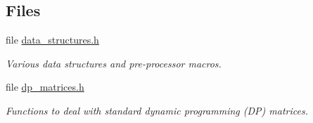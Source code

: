 \subsection*{Files}
\begin{DoxyCompactItemize}
\item 
file \mbox{\hyperlink{data__structures_8h}{data\+\_\+structures.\+h}}
\begin{DoxyCompactList}\small\item\em Various data structures and pre-\/processor macros. \end{DoxyCompactList}\item 
file \mbox{\hyperlink{dp__matrices_8h}{dp\+\_\+matrices.\+h}}
\begin{DoxyCompactList}\small\item\em Functions to deal with standard dynamic programming (DP) matrices. \end{DoxyCompactList}\end{DoxyCompactItemize}
